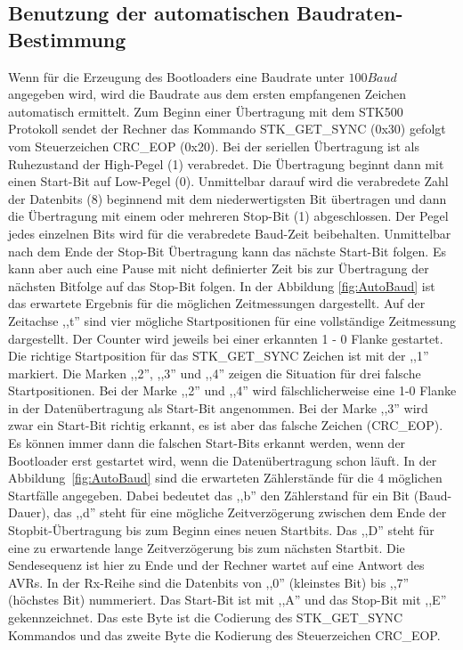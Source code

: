 \subsection{Benutzung der automatischen Baudraten-Bestimmung}
\label{sec:autobaud}

Wenn für die Erzeugung des Bootloaders eine Baudrate unter \(100Baud\)
angegeben wird, wird die Baudrate aus dem ersten empfangenen Zeichen
automatisch ermittelt.
Zum Beginn einer Übertragung mit dem STK500 Protokoll sendet der Rechner
das Kommando STK\_GET\_SYNC (0x30) gefolgt vom Steuerzeichen CRC\_EOP (0x20).
Bei der seriellen Übertragung ist als Ruhezustand der High-Pegel (1)
verabredet. Die Übertragung beginnt dann mit einen Start-Bit auf Low-Pegel (0).
Unmittelbar darauf wird die verabredete Zahl der Datenbits (8) beginnend
mit dem niederwertigsten Bit übertragen und dann die Übertragung mit einem oder
mehreren Stop-Bit (1) abgeschlossen. 
Der Pegel jedes einzelnen Bits wird für die verabredete Baud-Zeit beibehalten.
Unmittelbar nach dem Ende der Stop-Bit Übertragung kann das nächste Start-Bit
folgen. Es kann aber auch eine Pause mit nicht definierter Zeit bis zur 
Übertragung der nächsten Bitfolge auf das Stop-Bit folgen. 
In der Abbildung \ref{fig:AutoBaud} ist das erwartete Ergebnis für die möglichen
Zeitmessungen dargestellt. Auf der Zeitachse ,,t'' sind vier mögliche Startpositionen
für eine vollständige Zeitmessung dargestellt. Der Counter wird jeweils
bei einer erkannten 1 - 0 Flanke gestartet. Die richtige Startposition
für das STK\_GET\_SYNC Zeichen ist mit der ,,1'' markiert.
Die Marken ,,2'', ,,3'' und ,,4'' zeigen die Situation für drei falsche Startpositionen.
Bei der Marke ,,2'' und ,,4'' wird fälschlicherweise eine 1-0 Flanke in der
Datenübertragung als Start-Bit angenommen. Bei der Marke ,,3'' wird zwar
ein Start-Bit richtig erkannt, es ist aber das falsche Zeichen (CRC\_EOP).
Es können immer dann die falschen Start-Bits erkannt werden, wenn der Bootloader
erst gestartet wird, wenn die Datenübertragung schon läuft.
In der Abbildung~\ref{fig:AutoBaud} sind die erwarteten Zählerstände für die
4 möglichen Startfälle angegeben. Dabei bedeutet das ,,b'' den Zählerstand
für ein Bit (Baud-Dauer), das ,,d'' steht für eine mögliche Zeitverzögerung
zwischen dem Ende der Stopbit-Übertragung bis zum Beginn eines neuen Startbits.
Das ,,D'' steht für eine zu erwartende lange Zeitverzögerung bis zum nächsten
Startbit. Die Sendesequenz ist hier zu Ende und der Rechner wartet auf eine
Antwort des AVRs.
In der Rx-Reihe sind die Datenbits von ,,0'' (kleinstes Bit) bis ,,7'' (höchstes Bit)
nummeriert. Das Start-Bit ist mit ,,A'' und das Stop-Bit mit ,,E'' gekennzeichnet.
Das este Byte ist die Codierung des STK\_GET\_SYNC Kommandos und das zweite Byte
die Kodierung des Steuerzeichen CRC\_EOP.


